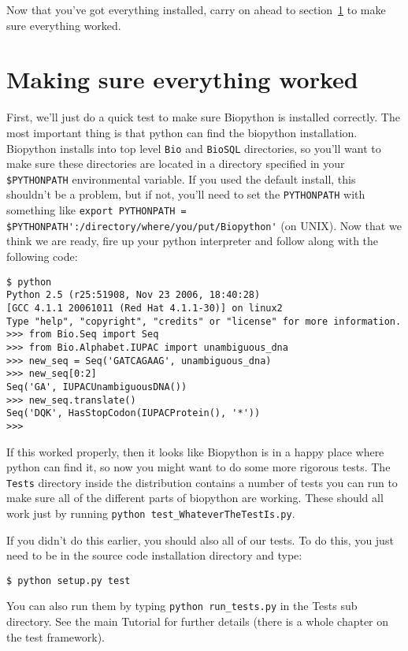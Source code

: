 \documentclass{article}
\begin{document}
Now that you've got everything installed, carry on ahead to section~\ref{sec:is_working} to make sure everything worked.

\section{Making sure everything worked}
\label{sec:is_working}

First, we'll just do a quick test to make sure Biopython is installed correctly. The most important thing is that python can find the biopython installation. Biopython installs into top level \verb|Bio| and \verb|BioSQL| directories, so you'll want to make sure these directories are located in a directory specified 
in your\verb| $PYTHONPATH| environmental variable. If you used the default install, this shouldn't be a problem, but if not, you'll need to set the \verb|PYTHONPATH| with something like \verb|export PYTHONPATH = $PYTHONPATH':/directory/where/you/put/Biopython'| (on UNIX). Now that we think we are ready, fire up your python interpreter and follow along with the following code:

\begin{verbatim}
$ python
Python 2.5 (r25:51908, Nov 23 2006, 18:40:28) 
[GCC 4.1.1 20061011 (Red Hat 4.1.1-30)] on linux2
Type "help", "copyright", "credits" or "license" for more information.
>>> from Bio.Seq import Seq
>>> from Bio.Alphabet.IUPAC import unambiguous_dna
>>> new_seq = Seq('GATCAGAAG', unambiguous_dna)
>>> new_seq[0:2]
Seq('GA', IUPACUnambiguousDNA())
>>> new_seq.translate()
Seq('DQK', HasStopCodon(IUPACProtein(), '*'))
>>>
\end{verbatim}

If this worked properly, then it looks like Biopython is in a happy place where python can find it, so now you might want to do some more rigorous tests. The \verb|Tests| directory inside the distribution contains a number of tests you can run to make sure all of the different parts of biopython are working. These should all work just by running \verb|python test_WhateverTheTestIs.py|. 

If you didn't do this earlier, you should also all of our tests. To do this, you just need to be in the source code installation directory and type:

\begin{verbatim}
$ python setup.py test
\end{verbatim}

You can also run them by typing \verb|python run_tests.py| in the Tests sub directory.
See the main Tutorial for further details (there is a whole chapter on the test framework).
\end{document}
